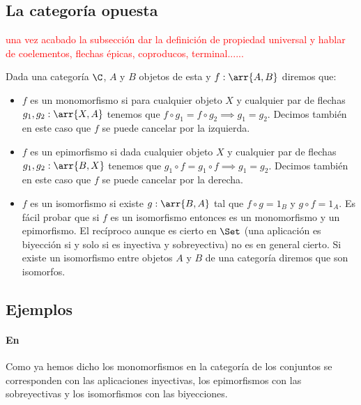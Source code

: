 \subsection{La categoría opuesta}


\textcolor{red}{una vez acabado la subsección dar la definición de propiedad universal y hablar de coelementos, flechas épicas, coproducos, terminal......}










Dada una categoría $\C$, $A$ y $B$ objetos de esta y
$f : \arr{A, B}$ diremos que:

\begin{itemize}
\item $f$ es un monomorfismo si para cualquier objeto $X$ y
      cualquier par de flechas $g_1, g_2 : \arr{X, A}$ tenemos
      que $f \circ g_1 = f \circ g_2 \implies g_1 = g_2$. Decimos
      también en este caso que $f$ se puede cancelar por la
      izquierda.

\item $f$ es un epimorfismo si dada cualquier objeto $X$ y
      cualquier par de flechas $g_1, g_2 : \arr{B, X}$
      tenemos que $g_1 \circ f = g_1 \circ f \implies g_1 = g_2$.
      Decimos también en este caso que $f$ se puede cancelar por la
      derecha.

\item $f$ es un isomorfismo si existe $g : \arr{B, A}$ tal que
      $f \circ g = 1_B$ y $g\circ f = 1_A$. Es fácil probar que
      si $f$ es un isomorfismo entonces es un monomorfismo y un
      epimorfismo. El recíproco aunque es cierto en $\Set$
      (una aplicación es biyección si y solo si es inyectiva y
      sobreyectiva) no es en general cierto. Si existe un isomorfismo
      entre objetos $A$ y $B$ de una categoría diremos que son
      isomorfos.
\end{itemize}

\subsection{Ejemplos}
\paragraph{En \Set}
Como ya hemos dicho los monomorfismos en la categoría de los conjuntos
se corresponden con las aplicaciones inyectivas, los epimorfismos con
las sobreyectivas y los isomorfismos con las biyecciones.

